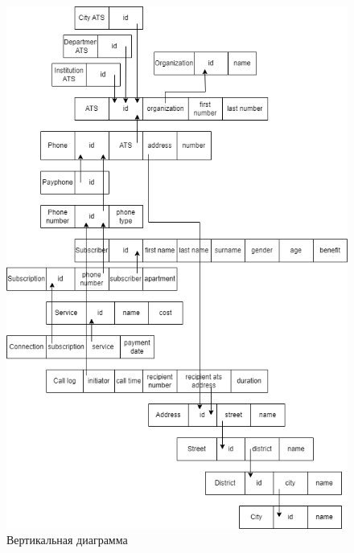 \documentclass{report}
\begin{document}
\begin{figure}[!ht]
    \begin{center}
    \includegraphics[height=0.9\textheight, keepaspectratio, width=\textwidth]{resources/vertical.png}
    \caption{Вертикальная диаграмма}
    \end{center}
\end{figure}
\end{document}
